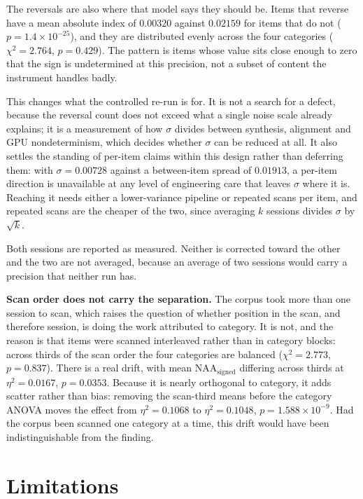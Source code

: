 The reversals are also where that model says they should be. Items that reverse have a mean
absolute index of $0.00320$ against $0.02159$ for items that do not
($p = 1.4\times10^{-25}$), and they are distributed evenly across the four categories
($\chi^2 = 2.764$, $p = 0.429$). The pattern is items whose value sits close enough to zero
that the sign is undetermined at this precision, not a subset of content the instrument
handles badly.

This changes what the controlled re-run is for. It is not a search for a defect, because the
reversal count does not exceed what a single noise scale already explains; it is a measurement
of how $\sigma$ divides between synthesis, alignment and GPU nondeterminism, which decides
whether $\sigma$ can be reduced at all. It also settles the standing of per-item claims within
this design rather than deferring them: with $\sigma = 0.00728$ against a between-item spread
of $0.01913$, a per-item direction is unavailable at any level of engineering care that leaves
$\sigma$ where it is. Reaching it needs either a lower-variance pipeline or repeated scans per
item, and repeated scans are the cheaper of the two, since averaging $k$ sessions divides
$\sigma$ by $\sqrt{k}$.

Both sessions are reported as measured. Neither is corrected toward the other and the two are
not averaged, because an average of two sessions would carry a precision that neither run
has.

\textbf{Scan order does not carry the separation.} The corpus took more than one session to
scan, which raises the question of whether position in the scan, and therefore session, is
doing the work attributed to category. It is not, and the reason is that items were scanned
interleaved rather than in category blocks: across thirds of the scan order the four
categories are balanced ($\chi^2 = 2.773$, $p = 0.837$). There is a real drift, with mean
$\mathrm{NAA}_{\text{signed}}$ differing across thirds at $\eta^2 = 0.0167$, $p = 0.0353$.
Because it is nearly orthogonal to category, it adds scatter rather than bias:
removing the scan-third means before the category ANOVA moves the effect from
$\eta^2 = 0.1068$ to $\eta^2 = 0.1048$, $p = 1.588\times10^{-9}$. Had the corpus been scanned
one category at a time, this drift would have been indistinguishable from the finding.

\section{Limitations}

